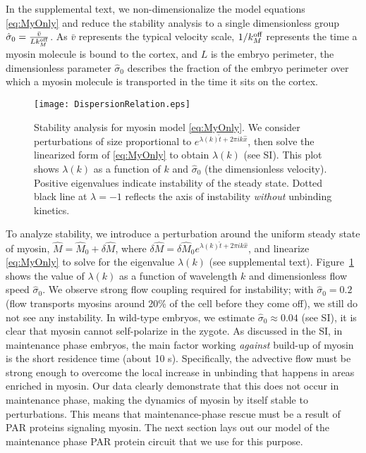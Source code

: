 \documentclass[11pt]{article}
\newcommand{\6}[1]{#1_{\text{6}}}
\newcommand{\3}[1]{#1_{\text{3}}}
\newcommand{\My}[1]{#1_M}
\begin{document}
In the supplemental text, we non-dimensionalize the model equations \eqref{eq:MyOnly} and reduce the stability analysis to a single dimensionless group $\hat{\sigma}_0 = \frac{\bar v}{L \My{\koff}}$. As $\bar v$ represents the typical velocity scale, $1/\My{\koff}$ represents the time a myosin molecule is bound to the cortex, and $L$ is the embryo perimeter, the dimensionless parameter $\hat \sigma_0$ 
describes the fraction of the embryo perimeter over which a myosin molecule is transported in the time it sits on the cortex.


\begin{figure}
\centering
\texttt{[image: DispersionRelation.eps]}
\caption{\label{fig:DispRelMy} Stability analysis for myosin model \eqref{eq:MyOnly}. We consider perturbations of size proportional to $e^{\lambda(k) \hat{t}+2 \pi i k \hat{x}}$, then solve the linearized form of \eqref{eq:MyOnly} to obtain $\lambda(k)$ (see SI). This plot shows $\lambda(k)$ as a function of $k$ and $\hat{\sigma}_0$ (the dimensionless velocity). Positive eigenvalues indicate instability of the steady state. Dotted black line at $\lambda=-1$ reflects the axis of instability \emph{without} unbinding kinetics.}
\end{figure}


To analyze stability, we introduce a perturbation around the uniform steady state of myosin, $\hat M=\hat{M}_0+\delta \hat M$, where $\delta \hat M = \delta \hat M_0 e^{\lambda(k) \hat{t}+2 \pi i k \hat{x}}$, and linearize \eqref{eq:MyOnly} to solve for the eigenvalue $\lambda(k)$ (see supplemental text). Figure\ \ref{fig:DispRelMy} shows the value of $\lambda(k)$ as a function of wavelength $k$ and dimensionless flow speed $\hat \sigma_0$. We observe strong flow coupling required for instability; with $\hat{\sigma}_0=0.2$ (flow transports myosins around 20\% of the cell before they come off), we still do not see any instability. In wild-type embryos, we estimate $\hat \sigma_0 \approx 0.04$ (see SI), it is clear that myosin cannot self-polarize in the zygote. As discussed in the SI, in maintenance phase embryos, the main factor working \emph{against} build-up of myosin is the short residence time (about 10 s). Specifically, the advective flow must be strong enough to overcome the local increase in unbinding that happens in areas enriched in myosin. Our data clearly demonstrate that this does not occur in maintenance phase, making the dynamics of myosin by itself stable to perturbations. This means that maintenance-phase rescue must be a result of PAR proteins signaling myosin. The next section lays out our model of the maintenance phase PAR protein circuit that we use for this purpose. 
\end{document}
